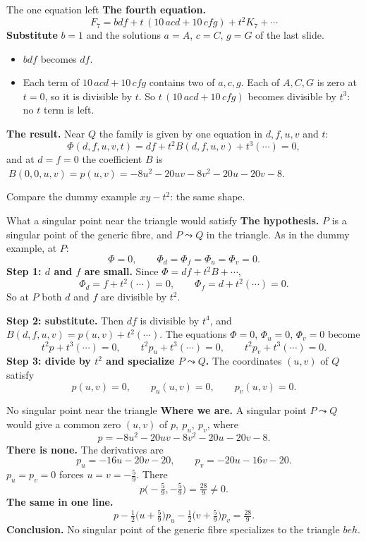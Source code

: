 \begin{frame}{The one equation left}
\textbf{The fourth equation.}
\[
F_7=bdf+t\,(10\,acd+10\,cfg)+t^2K_7+\cdots
\]
\textbf{Substitute} \(b=1\) and the solutions \(a=A\), \(c=C\), \(g=G\) of the last slide.
\begin{itemize}
\setlength{\itemsep}{0pt}
\item \(bdf\) becomes \(df\).
\item Each term of \(10\,acd+10\,cfg\) contains two of \(a,c,g\). Each of \(A,C,G\) is zero at \(t=0\), so it is divisible by \(t\). So \(t\,(10\,acd+10\,cfg)\) becomes divisible by \(t^3\): no \(t\) term is left.
\end{itemize}
\textbf{The result.} Near \(Q\) the family is given by one equation in \(d,f,u,v\) and \(t\):
\[
\boxed{\Phi(d,f,u,v,t)=df+t^2B(d,f,u,v)+t^3(\cdots)=0,}
\]
and at \(d=f=0\) the coefficient \(B\) is \(\ B(0,0,u,v)=p(u,v)=-8u^2-20uv-8v^2-20u-20v-8\).
\par
Compare the dummy example \(xy-t^2\): the same shape.
\src{\textcolor{red}{\(H_7\) and \(p\) are copied, not re-derived.}}
\end{frame}

\begin{frame}{What a singular point near the triangle would satisfy}
\textbf{The hypothesis.} \(P\) is a singular point of the generic fibre, and \(P\leadsto Q\) in the triangle. As in the dummy example, at \(P\):
\[
\Phi=0,\qquad \Phi_d=\Phi_f=\Phi_u=\Phi_v=0 .
\]
\textbf{Step 1: \(d\) and \(f\) are small.} Since \(\Phi=df+t^2B+\cdots\),
\[
\Phi_d=f+t^2(\cdots)=0,\qquad \Phi_f=d+t^2(\cdots)=0 .
\]
So at \(P\) both \(d\) and \(f\) are divisible by \(t^2\).
\par
\textbf{Step 2: substitute.} Then \(df\) is divisible by \(t^4\), and \(B(d,f,u,v)=p(u,v)+t^2(\cdots)\). The equations \(\Phi=0\), \(\Phi_u=0\), \(\Phi_v=0\) become
\[
t^2p+t^3(\cdots)=0,\qquad t^2p_u+t^3(\cdots)=0,\qquad t^2p_v+t^3(\cdots)=0 .
\]
\textbf{Step 3: divide by \(t^2\) and specialize \(P\leadsto Q\).} The coordinates \((u,v)\) of \(Q\) satisfy
\[
\boxed{p(u,v)=0,\qquad p_u(u,v)=0,\qquad p_v(u,v)=0.}
\]
\end{frame}

\begin{frame}{No singular point near the triangle}
\textbf{Where we are.} A singular point \(P\leadsto Q\) would give a common zero \((u,v)\) of \(p,\ p_u,\ p_v\), where
\[
p=-8u^2-20uv-8v^2-20u-20v-8 .
\]
\textbf{There is none.} The derivatives are
\[
p_u=-16u-20v-20,\qquad p_v=-20u-16v-20 .
\]
\(p_u=p_v=0\) forces \(u=v=-\tfrac59\). There
\[
p\bigl(-\tfrac59,-\tfrac59\bigr)=\tfrac{28}9\ne0 .
\]
\textbf{The same in one line.}
\[
\boxed{p-\tfrac12\bigl(u+\tfrac59\bigr)p_u-\tfrac12\bigl(v+\tfrac59\bigr)p_v=\tfrac{28}{9}.}
\]
\textbf{Conclusion.} No singular point of the generic fibre specializes to the triangle \(beh\).
\end{frame}

